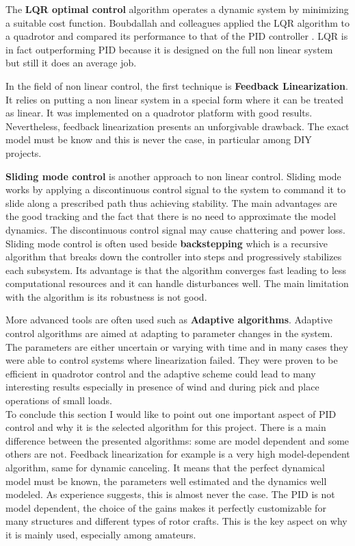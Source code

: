 The \textbf{LQR optimal control} algorithm operates a dynamic system by minimizing a suitable cost function. Boubdallah and colleagues applied the LQR algorithm to a quadrotor and compared its performance to that of the PID controller \cite{BouabdallahLQR}. LQR is in fact outperforming PID because it is designed on the full non linear system but still it does an average job. \par In the field of non linear control, the first technique is \textbf{Feedback Linearization}. It relies on putting a non linear system in a special form where it can be treated as linear. It was implemented on a quadrotor platform \cite{Altug2002} with good results. Nevertheless, feedback linearization presents an unforgivable drawback. The exact model must be know and this is never the case, in particular among DIY projects.\par \textbf{Sliding mode control} is another approach to non linear control. Sliding mode works by applying a discontinuous control signal to the system to command it to slide along a prescribed path thus achieving stability. The main advantages are the good tracking and the fact that there is no need to approximate the model dynamics. The discontinuous control signal may cause chattering and power loss. Sliding mode control is often used beside \textbf{backstepping} \cite{Bouadi2007} which is a recursive algorithm that breaks down the controller into steps and progressively stabilizes each subsystem. Its advantage is that the algorithm converges fast leading to less computational resources and it can handle disturbances well. The main limitation with the algorithm is its robustness is not good. \par More advanced tools are often used such as \textbf{Adaptive algorithms}. Adaptive control algorithms are aimed at adapting to parameter changes in the system. The parameters are either uncertain or varying with time and in many cases they were able to control systems where linearization failed. They were proven to be efficient in quadrotor control \cite{Antonelli2013} and the adaptive scheme could lead to many interesting results especially in presence of wind and during pick and place operations of small loads.\\ 

\noindent
To conclude this section I would like to point out one important aspect of PID control and why it is the selected algorithm for this project. There is a main difference between the presented algorithms: some are model dependent and some others are not. Feedback linearization for example is a very high model-dependent algorithm, same for dynamic canceling. It means that the perfect dynamical model must be known, the parameters well estimated and the dynamics well modeled. As experience suggests, this is almost never the case. The PID is not model dependent, the choice of the gains makes it perfectly customizable for many structures and different types of rotor crafts. This is the key aspect on why it is mainly used, especially among amateurs.

